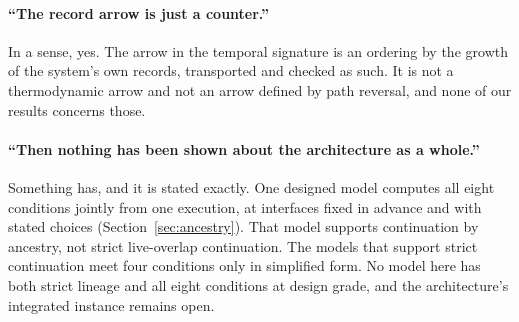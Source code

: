 \paragraph{``The record arrow is just a counter.''}
In a sense, yes. The arrow in the temporal signature is an ordering by the
growth of the system's own records, transported and checked as such. It is not
a thermodynamic arrow and not an arrow defined by path reversal, and none of
our results concerns those.

\paragraph{``Then nothing has been shown about the architecture as a whole.''}
Something has, and it is stated exactly. One designed model computes all eight
conditions jointly from one execution, at interfaces fixed in advance and with
stated choices (Section~\ref{sec:ancestry}). That model supports continuation
by ancestry, not strict live-overlap continuation. The models that support
strict continuation meet four conditions only in simplified form. No model
here has both strict lineage and all eight conditions at design grade, and the
architecture's integrated instance remains open.
